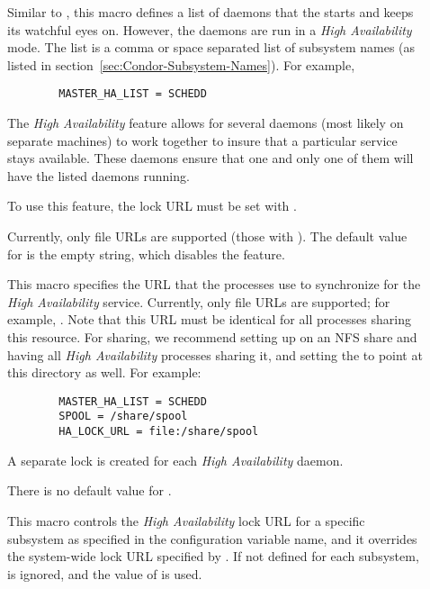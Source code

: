 \begin{description}
\item[] \label{param:MasterHAList} Similar to
  , this macro defines a list of daemons that
  the  starts and keeps its watchful eyes on.
  However, the  daemons are run in a
  \emph{High Availability} mode.
  The list is a comma or space separated list of subsystem names
  (as listed in section~\ref{sec:Condor-Subsystem-Names}).
  For example,
  \begin{verbatim}
        MASTER_HA_LIST = SCHEDD
  \end{verbatim}

  The \emph{High Availability} feature allows for several 
  daemons (most likely on separate machines) to work together to
  insure that a particular service stays available.  These
   daemons ensure that one and only one of them will
  have the listed daemons running.

  To use this feature, the lock URL must be set with
  .

  Currently, only file URLs are supported 
  (those with ).
  The default value for  is 
  the empty string, which disables the feature.
  
\item[] \label{param:HALockURL} This macro
  specifies the URL that the  processes use to
  synchronize for the \emph{High Availability} service.
  Currently, only file URLs are supported; for example,
  .  Note that this URL must be identical
  for all  processes sharing this resource.  For
   sharing, we recommend setting up 
  on an NFS share and having all \emph{High Availability}
   processes sharing it,
  and setting the  to point at this directory
  as well.  For example:
\begin{verbatim}
        MASTER_HA_LIST = SCHEDD
        SPOOL = /share/spool
        HA_LOCK_URL = file:/share/spool
\end{verbatim}

  A separate lock is created for each \emph{High Availability} daemon.

  There is no default value for .

\item[]
  \label{param:HASubsysLockURL} This macro controls the 
  \emph{High Availability} lock URL for a specific subsystem
  as specified in the configuration variable name,
  and it overrides the system-wide lock URL specified by
  .  If not defined for each subsystem,
   is ignored, and the value of
   is used.


\end{description}
